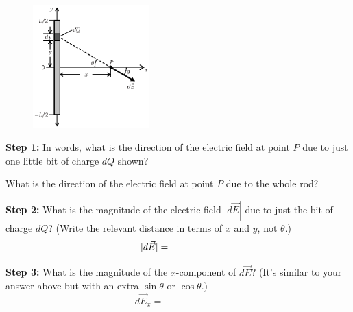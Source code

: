 \begin{figure}
\vspace{-.65in}
   \includegraphics[width=0.4\textwidth]{electric_field_near_a_charged_rod/fig2.eps}
\end{figure}


\par
\vspace{0.5cm}
\par
\textbf{Step 1:} \newline
In words, what is the direction of the electric field at point $P$ due to just one little bit of charge $dQ$ shown?

\vspace{.6in}

What is the direction of the electric field at point $P$ due to the whole rod?

\vspace{.6in}

\textbf{Step 2:} \newline
What is the magnitude of the electric field $|d\vec{E}|$  due to just the bit of charge $dQ$?  (Write the relevant distance in terms of $x$ and $y$, not $\theta$.)
\[
|d\vec{E}|=\hspace{0.7in}
\]
\vspace{.3in}

\textbf{Step 3:} \newline
What is the magnitude of the $x$-component of   $d\vec{E}$?  (It's similar to your answer above but with an extra $\sin \theta$ or $\cos \theta$.) 
\[
d\vec{E}_x=\hspace{1in}
\]
\vspace{.3in}

